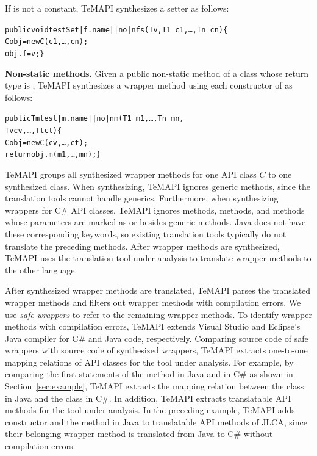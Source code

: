 If  is not a constant, TeMAPI synthesizes a setter as follows:

\begin{CodeOut}\vspace*{-1.5ex}
\begin{alltt}
 public void testSet|f.name||no|nfs(T v, T1\ c1,\ldots, Tn\ cn)\{
   C obj = new C(c1,\ldots, cn);
   obj.f = v; \}
\end{alltt}
\end{CodeOut}\vspace*{-1.5ex}

\textbf{Non-static methods.} Given a public non-static method  of a class  whose return type is , TeMAPI synthesizes a wrapper method using each constructor  of  as follows:

\begin{CodeOut}\vspace*{-1.5ex}
\begin{alltt}
 public Tm test|m.name||no|nm(T1\ m1,\ldots, Tn\ mn,
                            Tv cv, \ldots, Tt ct)\{
   C obj = new C(cv,\ldots, ct);
   return obj.m(m1,\ldots, mn); \}
\end{alltt}
\end{CodeOut}\vspace*{-1.5ex}


TeMAPI groups all synthesized wrapper methods for one API class $C$ to one synthesized class. When synthesizing, TeMAPI ignores generic methods, since the translation tools cannot handle generics. Furthermore, when synthesizing wrappers for C\# API classes, TeMAPI ignores  methods,  methods, and methods whose parameters are marked as  or  besides generic methods. Java does not have these corresponding keywords, so existing translation tools typically do not translate the preceding methods. After wrapper methods are synthesized, TeMAPI uses the translation tool under analysis to translate wrapper methods to the other language.

After synthesized wrapper methods are translated, TeMAPI parses the translated wrapper methods and filters out wrapper methods with compilation errors. We use \emph{safe wrappers} to refer to the remaining wrapper methods. To identify wrapper methods with compilation errors, TeMAPI extends Visual Studio and Eclipse's Java compiler for C\# and Java code, respectively. Comparing source code of safe wrappers with source code of synthesized wrappers, TeMAPI extracts one-to-one mapping relations of API classes for the tool under analysis. For example, by comparing the first statements of the  method in Java and in C\# as shown in Section~\ref{sec:example}, TeMAPI extracts the mapping relation between the  class in Java and the  class in C\#. In addition, TeMAPI extracts translatable API methods for the tool under analysis. In the preceding example, TeMAPI adds  constructor and the  method in Java to translatable API methods of JLCA, since their belonging wrapper method is translated from Java to C\# without compilation errors.

